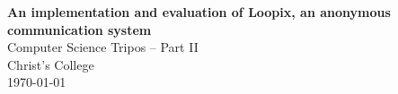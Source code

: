 \documentclass[final,dissertation.tex]{subfiles}
\begin{document}
\pagestyle{empty}


\vspace*{60mm}
\begin{center}
	\Huge
	\textbf{An implementation and evaluation of Loopix, an anonymous communication system} \\[5mm]
	Computer Science Tripos -- Part II \\[5mm]
	Christ's College \\[5mm]
	\today  %
\end{center}
\end{document}
